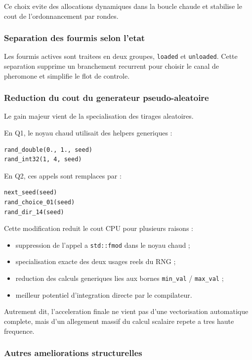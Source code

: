 \documentclass[11pt,a4paper]{article}
\begin{document}
Ce choix evite des allocations dynamiques dans la boucle chaude et stabilise le cout de l'ordonnancement par rondes.

\subsubsection{Separation des fourmis selon l'etat}

Les fourmis actives sont traitees en deux groupes, \texttt{loaded} et \texttt{unloaded}. Cette separation supprime un branchement recurrent pour choisir le canal de pheromone et simplifie le flot de controle.

\subsubsection{Reduction du cout du generateur pseudo-aleatoire}

Le gain majeur vient de la specialisation des tirages aleatoires.

En Q1, le noyau chaud utilisait des helpers generiques :

\begin{verbatim}
rand_double(0., 1., seed)
rand_int32(1, 4, seed)
\end{verbatim}

En Q2, ces appels sont remplaces par :

\begin{verbatim}
next_seed(seed)
rand_choice_01(seed)
rand_dir_14(seed)
\end{verbatim}

Cette modification reduit le cout CPU pour plusieurs raisons :

\begin{itemize}[leftmargin=1.2em]
  \item suppression de l'appel a \texttt{std::fmod} dans le noyau chaud ;
  \item specialisation exacte des deux usages reels du RNG ;
  \item reduction des calculs generiques lies aux bornes \texttt{min\_val} / \texttt{max\_val} ;
  \item meilleur potentiel d'integration directe par le compilateur.
\end{itemize}

Autrement dit, l'acceleration finale ne vient pas d'une vectorisation automatique complete, mais d'un allegement massif du calcul scalaire repete a tres haute frequence.

\subsubsection{Autres ameliorations structurelles}
\end{document}
